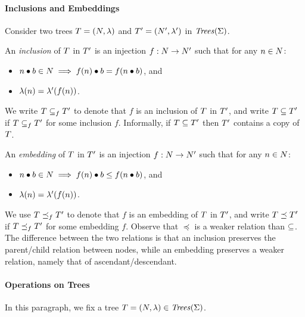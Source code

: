 \paragraph{\bf Inclusions and Embeddings}
%
Consider two trees $T=\left(N,\lambda\right)$ and $T'=\left(N',\lambda'\right)$ 
in ${\it Trees}({\Sigma})$.
%

An \emph{inclusion} of $T$ in $T'$ is an injection $f:N\to
N'$ such that for any $n\in N$: 
%
\begin{itemize}
\item $n\bullet b\in N\implies f(n)\bullet b=f(n\bullet b)$, and
%
\item $\lambda(n)=\lambda'(f(n))$.
%
\end{itemize}
%
We write $T\subseteq_fT'$ to denote that $f$ is an inclusion
of $T$ in $T'$, and write $T\subseteq T'$ if
$T\subseteq_fT'$ for some inclusion $f$.
%
Informally, if $T\subseteq T'$ then $T'$ contains a copy of $T$.
%

An \emph{embedding} of $T$ in $T'$ is an injection $f:N\to N'$ such that 
for any $n\in N$: 
%
\begin{itemize}
\item $n\bullet b\in N\implies f(n)\bullet b\le f(n\bullet b)$, and
%
\item $\lambda(n)=\lambda'(f(n))$.
\end{itemize}
%
We use $T\preceq_fT'$ to denote that $f$ is an embedding of $T$ in $T'$, and 
write $T\preceq T'$ if $T\preceq_fT'$ for some embedding $f$.
%
Observe that $\preceq$ is a weaker relation than $\subseteq$.
%
The difference between the two relations is that an inclusion
preserves the parent/child relation between nodes, while an embedding preserves a weaker 
relation, namely that of ascendant/descendant.
%


\paragraph{\bf Operations on Trees}
%
In this paragraph, we fix a tree $T=(N,\lambda)\in{\it Trees}({\Sigma})$.

